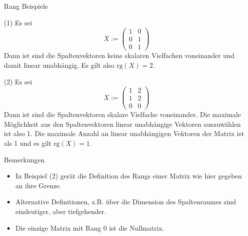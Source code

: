 \documentclass[
  8pt,
  ignorenonframetext,
]{beamer}
\providecommand{\tightlist}{%
  \setlength{\itemsep}{0pt}\setlength{\parskip}{0pt}}
\begin{document}
\begin{frame}{Rang}
\protect\hypertarget{rang-2}{}
Beispiele

\footnotesize

\noindent (1) Es sei \begin{equation}
X := \begin{pmatrix} 1 & 0  \\ 0 & 1  \\ 0 &  1  \end{pmatrix}
\end{equation} Dann ist sind die Spaltenvektoren keine skalaren
Vielfachen voneinander und damit linear unabhängig. Es gilt also
\(\mbox{rg}(X) = 2\).

\noindent (2) Es sei \begin{equation}
X := \begin{pmatrix} 1 & 2  \\ 1 & 2  \\ 0 &  0  \end{pmatrix}
\end{equation} Dann ist sind die Spaltenvektoren skalare Vielfache
voneinander. Die maximale Möglichkeit aus den Spaltenvektoren linear
unabhängige Vektoren auszuwählen ist also 1. Die maximale Anzahl an
linear unabhängigen Vektoren der Matrix ist als 1 und es gilt
\(\mbox{rg}(X) = 1\).

Bemerkungen

\begin{itemize}
\tightlist
\item
  In Beispiel (2) gerät die Definition des Rangs einer Matrix wie hier
  gegeben an ihre Grenze.
\item
  Alternative Definitionen, z.B. über die Dimension des Spaltenraumes
  sind eindeutiger, aber tiefgehender.
\item
  Die einzige Matrix mit Rang 0 ist die Nullmatrix.
\end{itemize}
\end{frame}
\end{document}
